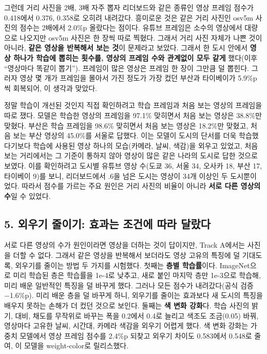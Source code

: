 \documentclass[11pt]{article}
\begin{document}
그런데 거리 사진을 2배, 3배 자주 뽑자 리더보드와 같은 종류인 영상 프레임 점수가 0.418에서 0.376, 0.358로 오히려 내려갔다. 흥미로운 것은 같은 거리 사진인 osv5m 사진의 점수는 2배에서 2.0\%p 올랐다는 점이다. 유튜브 프레임은 소수의 영상에서 대량으로 나오지만 osv5m 사진은 한 장씩 따로 찍혔다. 그래서 거리 사진 자체가 나쁜 것이 아니라, \textbf{같은 영상을 반복해서 보는 것}이 문제라고 보았다. 그래서 한 도시 안에서 \textbf{영상 하나가 학습에 뽑히는 횟수를, 영상의 프레임 수와 관계없이 모두 같게} 했다(이후 ``영상마다 똑같이 뽑기''). 프레임이 많은 영상은 프레임 한 장이 그만큼 덜 뽑힌다. 그러자 영상 몇 개가 프레임을 몰아서 가진 정도가 가장 컸던 부산과 타이베이가 5.9\%p씩 회복되어, 이 생각과 맞았다.

정말 학습이 개선된 것인지 직접 확인하려고 학습 프레임과 처음 보는 영상의 프레임을 따로 쟀다. 모델은 학습한 영상의 프레임을 97.1\% 맞히면서 처음 보는 영상은 38.8\%만 맞혔다. 부산은 학습 프레임을 98.6\% 맞히면서 처음 보는 영상은 18.2\%만 맞혔고, 처음 보는 부산 영상의 45.0\%를 서울로 답했다. 이는 모델이 도시의 단서를 더욱 학습했다기보다 학습에 사용된 영상 하나의 모습(카메라, 날씨, 색감)을 외우고 있었고, 처음 보는 거리에서는 그 기준이 통하지 않아 영상이 많은 같은 나라의 도시로 답한 것으로 보였다. 이를 확인하려고 도시별 유튜브 영상 수(도쿄 36, 서울 34, 오사카 18, 부산 17, 타이베이 9)를 보니, 리더보드에서 .6을 넘은 도시는 영상이 34개 이상인 두 도시뿐이었다. 따라서 점수를 가르는 주요 원인은 거리 사진의 비율이 아니라 \textbf{서로 다른 영상의 수}일 수 있었다.

\subsection*{5. 외우기 줄이기: 효과는 조건에 따라 달랐다}

서로 다른 영상의 수가 원인이라면 영상을 더하는 것이 답이지만, Track A에서는 사진을 더할 수 없다. 그래서 같은 영상을 반복해서 보더라도 영상 고유의 특징에 덜 기대도록, 외우기를 줄이는 방법 두 가지를 시험했다. 첫째는 \textbf{층별 학습률}이다. ImageNet으로 미리 학습된 층은 학습률을 1e-4로 낮추고, 새로 붙인 마지막 층만 1e-3으로 학습해, 미리 배운 일반적인 특징을 덜 바꾸게 했다. 그러나 모든 점수가 내려갔다(공식 검증 −1.6\%p). 미리 배운 층을 덜 바꾸게 하니, 외우기를 줄이는 효과보다 새 도시의 특징을 배우지 못하는 손해가 더 컸던 것으로 보인다. 둘째는 \textbf{색 변화 강화}다. 학습 사진의 밝기, 대비, 채도를 무작위로 바꾸는 폭을 0.2에서 0.4로 늘리고 색조도 조금(0.05) 바꿔, 영상마다 고유한 날씨, 시간대, 카메라 색감을 외우기 어렵게 했다. 색 변화 강화는 가중치 모델에서 영상 프레임 점수를 2.4\%p 되찾고 외우기 차이도 0.583에서 0.548로 줄여, 이 모델을 weight-color로 릴리스했다.
\end{document}
